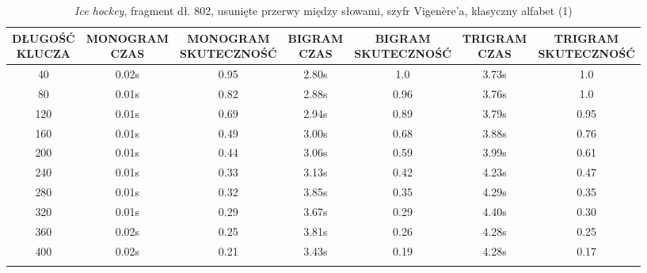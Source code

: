 \documentclass[a4paper]{article}
\theoremstyle{defn}
\theoremstyle{theorem}
\theoremstyle{lemma}
\theoremstyle{cor}
\theoremstyle{fact}
\begin{document}
\begin{center}\begin{small}\begin{longtable}{|c|c|c|c|c|c|c|}
\hline \makecell{DŁUGOŚĆ\\KLUCZA} &  \makecell{MONOGRAM\\CZAS} & \makecell{MONOGRAM\\SKUTECZNOŚĆ} & \makecell{BIGRAM\\CZAS} &  \makecell{BIGRAM\\SKUTECZNOŚĆ} & \makecell{TRIGRAM\\CZAS} & \makecell{TRIGRAM\\SKUTECZNOŚĆ}\\ \hline
40 & 0.02s & 0.95 & 2.80s & 1.0 & 3.73s & 1.0 \\ \hline
80 & 0.01s & 0.82 & 2.88s & 0.96 & 3.76s & 1.0 \\ \hline
120 & 0.01s & 0.69 & 2.94s & 0.89 & 3.79s & 0.95 \\ \hline
160 & 0.01s & 0.49 & 3.00s & 0.68 & 3.88s & 0.76 \\ \hline
200 & 0.01s & 0.44 & 3.06s & 0.59 & 3.99s & 0.61 \\ \hline
240 & 0.01s & 0.33 & 3.13s & 0.42 & 4.23s & 0.47 \\ \hline
280 & 0.01s & 0.32 & 3.85s & 0.35 & 4.29s & 0.35 \\ \hline
320 & 0.01s & 0.29 & 3.67s & 0.29 & 4.40s & 0.30 \\ \hline
360 & 0.02s & 0.25 & 3.81s & 0.26 & 4.28s & 0.25 \\ \hline
400 & 0.02s & 0.21 & 3.43s & 0.19 & 4.28s & 0.17 \\ \hline
\caption{\textit{Ice hockey}, fragment dł. 802, usunięte przerwy między słowami, szyfr Vigenère'a, klasyczny alfabet (1)}
\end{longtable}\end{small}\end{center}
\end{document}
